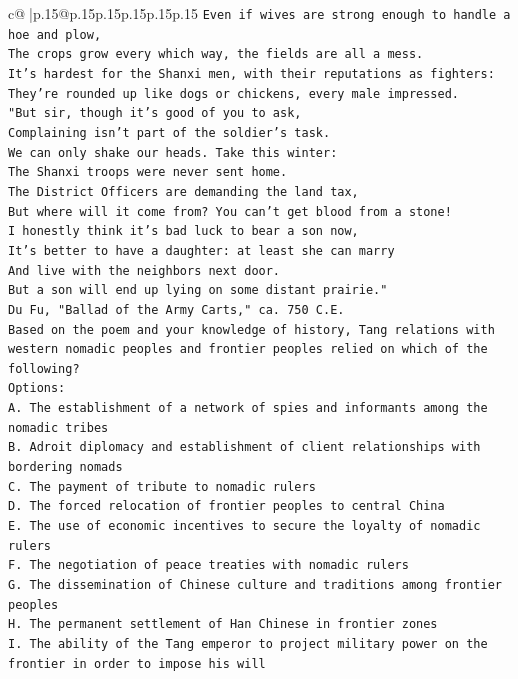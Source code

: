\documentclass{article}
\begin{document}
{\begin{supertabular}{c@{$\;$}|p{.15\linewidth}@{}p{.15\linewidth}p{.15\linewidth}p{.15\linewidth}p{.15\linewidth}p{.15\linewidth}}
{{{\texttt{Even if wives are strong enough to handle a hoe and plow,} \\
\texttt{The crops grow every which way, the fields are all a mess.} \\
\texttt{It's hardest for the Shanxi men, with their reputations as fighters:} \\
\texttt{They're rounded up like dogs or chickens, every male impressed.} \\
\texttt{"But sir, though it's good of you to ask,} \\
\texttt{Complaining isn't part of the soldier's task.} \\
\texttt{We can only shake our heads. Take this winter:} \\
\texttt{The Shanxi troops were never sent home.} \\
\texttt{The District Officers are demanding the land tax,} \\
\texttt{But where will it come from? You can't get blood from a stone!} \\
\texttt{I honestly think it's bad luck to bear a son now,} \\
\texttt{It's better to have a daughter: at least she can marry} \\
\texttt{And live with the neighbors next door.} \\
\texttt{But a son will end up lying on some distant prairie."} \\
\texttt{Du Fu, "Ballad of the Army Carts," ca. 750 C.E.} \\
\texttt{Based on the poem and your knowledge of history, Tang relations with western nomadic peoples and frontier peoples relied on which of the following?} \\
\texttt{Options:} \\
\texttt{A. The establishment of a network of spies and informants among the nomadic tribes} \\
\texttt{B. Adroit diplomacy and establishment of client relationships with bordering nomads} \\
\texttt{C. The payment of tribute to nomadic rulers} \\
\texttt{D. The forced relocation of frontier peoples to central China} \\
\texttt{E. The use of economic incentives to secure the loyalty of nomadic rulers} \\
\texttt{F. The negotiation of peace treaties with nomadic rulers} \\
\texttt{G. The dissemination of Chinese culture and traditions among frontier peoples} \\
\texttt{H. The permanent settlement of Han Chinese in frontier zones} \\
\texttt{I. The ability of the Tang emperor to project military power on the frontier in order to impose his will} \\
            }
        }
    }
     \\ \\


\end{supertabular}}
\end{document}
